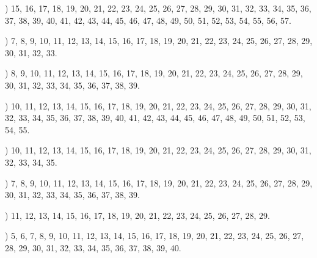 \documentclass[a4paper,11pt]{article}
\begin{document}
\noindent
{}) 15, 16, 17, 18, 19, 20, 21, 22, 23, 24, 25, 26, 27,
28, 29, 30, 31, 32, 33, 34, 35, 36, 37, 38, 39, 40, 41, 42, 43, 44,
45, 46, 47, 48, 49, 50, 51, 52, 53, 54, 55, 56, 57.

\vspace{\spaceFour}



\noindent
{}) 7, 8, 9, 10, 11, 12, 13, 14, 15, 16, 17, 18, 19, 20,
21, 22, 23, 24, 25, 26, 27, 28, 29, 30, 31, 32, 33.

\vspace{\spaceFour}



\noindent
{}) 8, 9, 10, 11, 12, 13, 14, 15, 16, 17, 18, 19, 20, 21,
22, 23, 24, 25, 26, 27, 28, 29, 30, 31, 32, 33, 34, 35, 36, 37, 38, 39.

\vspace{\spaceFour}



\noindent
{}) 10, 11, 12, 13, 14, 15, 16, 17, 18, 19, 20, 21, 22,
23, 24, 25, 26, 27, 28, 29, 30, 31, 32, 33, 34, 35, 36, 37, 38, 39,
40, 41, 42, 43, 44, 45, 46, 47, 48, 49, 50, 51, 52, 53, 54, 55.

\vspace{\spaceFour}



\noindent
{}) 10, 11, 12, 13, 14, 15, 16, 17, 18, 19, 20, 21, 22,
23, 24, 25, 26, 27, 28, 29, 30, 31, 32, 33, 34, 35.

\vspace{\spaceFour}



\noindent
{}) 7, 8, 9, 10, 11, 12, 13, 14, 15, 16, 17, 18, 19, 20,
21, 22, 23, 24, 25, 26, 27, 28, 29, 30, 31, 32, 33, 34, 35, 36, 37,
38, 39.

\vspace{\spaceFour}



\noindent
{}) 11, 12, 13, 14, 15, 16, 17, 18, 19, 20, 21, 22, 23,
24, 25, 26, 27, 28, 29.

\vspace{\spaceFour}



\noindent
{}) 5, 6, 7, 8, 9, 10, 11, 12, 13, 14, 15, 16, 17, 18,
19, 20, 21, 22, 23, 24, 25, 26, 27, 28, 29, 30, 31, 32, 33, 34, 35,
36, 37, 38, 39, 40.

\vspace{\spaceFour}
\end{document}
